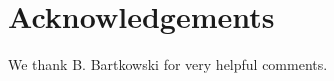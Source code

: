 \documentclass[version=3.21, pagesize, twoside=off, bibliography=totoc, DIV=calc, fontsize=12pt, a4paper, french, english]{scrartcl}
\newenvironment{acknowledgements}{
	\section*{Acknowledgements}
}{
}
\begin{document}

\begin{acknowledgements}
We thank B. Bartkowski for very helpful comments.
\end{acknowledgements}



\end{document}
